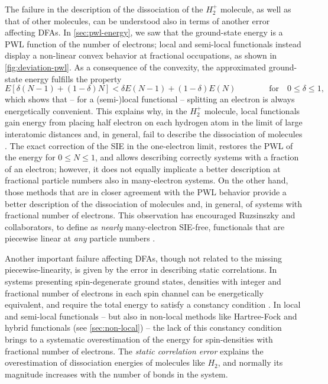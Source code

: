 The failure in the description of the dissociation of the $H_2^+$ molecule, as well as that of other molecules, can be understood also in terms of another error affecting DFAs. In \cref{sec:pwl-energy}, we saw that the ground-state energy is a PWL function of the number of electrons; local and semi-local functionals instead display a non-linear convex behavior at fractional occupations, as shown in \cref{fig:deviation-pwl}. As a consequence of the convexity, the approximated ground-state energy fulfills the property
%
\begin{equation}
    E \left[ \delta(N-1) + (1-\delta)N \right] < \delta E(N-1) + (1-\delta) E(N) \qquad \qquad
    \text{for} \quad 0 \leq \delta \leq 1 ,
    \label{eq:convexity}
\end{equation}
%
which shows that -- for a (semi-)local functional -- splitting an electron is always energetically convenient. This explains why, in the $H_2^+$ molecule, local functionals gain energy from placing half electron on each hydrogen atom in the limit of large interatomic distances and, in general, fail to describe the dissociation of molecules \cite{vydrov_tests_2007}. The exact correction of the SIE in the one-electron limit, restores the PWL of the energy for $0 \leq N \leq 1$, and allows describing correctly systems with a fraction of an electron; however, it does not equally implicate a better description at fractional particle numbers also in many-electron systems. On the other hand, those methods that are in closer agreement with the PWL behavior provide a better description of the dissociation of molecules and, in general, of systems with fractional number of electrons. This observation has encouraged Ruzsinszky and collaborators, to define as \emph{nearly} many-electron SIE-free, functionals that are piecewise linear at \emph{any} particle numbers \cite{ruzsinszky_spurious_2006}.

Another important failure affecting DFAs, though not related to the missing piecewise-linearity, is given by the error in describing static correlations. In systems presenting spin-degenerate ground states, densities with integer and fractional number of electrons in each spin channel can be energetically equivalent, and require the total energy to satisfy a constancy condition  \cite{cohen_fractional-spins_2008, cohen_insights_2008}. In local and semi-local functionals -- but also in non-local methods like Hartree-Fock and hybrid functionals (see \cref{sec:non-local}) -- the lack of this constancy condition brings to a systematic overestimation of the energy for spin-densities with fractional number of electrons. The \emph{static correlation error} explains the overestimation of dissociation energies of molecules like $H_2$, and normally its magnitude increases with the number of bonds in the system.

